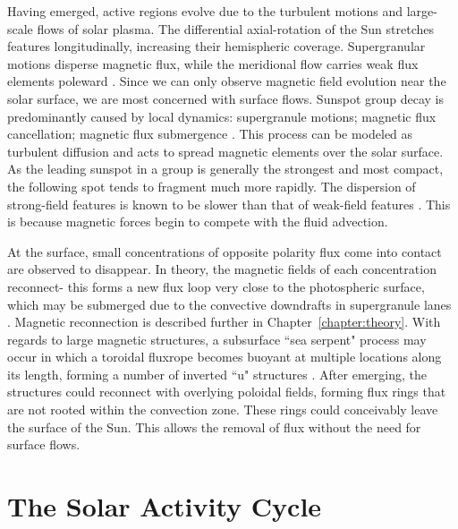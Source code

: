 Having emerged, active regions evolve due to the turbulent motions and large-scale flows of solar plasma. The differential axial-rotation of the Sun stretches features longitudinally, increasing their hemispheric coverage. Supergranular motions disperse magnetic flux, while the meridional flow carries weak flux elements poleward \citep{Mosher:1977}. Since we can only observe magnetic field evolution near the solar surface, we are most concerned with surface flows. Sunspot group decay is predominantly caused by local dynamics: supergranule motions; magnetic flux cancellation; magnetic flux submergence \citep{Schrijver:1997b}. This process can be modeled as turbulent diffusion \citep{Spruit:1987} and acts to spread magnetic elements over the solar surface. As the leading sunspot in a group is generally the strongest and most compact, the following spot tends to fragment much more rapidly. The dispersion of strong-field features is known to be slower than that of weak-field features \citep{Schrijver:1996}. This is because magnetic forces begin to compete with the fluid advection. 

At the surface, small concentrations of opposite polarity flux come into contact are observed to disappear. In theory, the magnetic fields of each concentration reconnect- this forms a new flux loop very close to the photospheric surface, which may be submerged due to the convective downdrafts in supergranule lanes \citep{Schrijver:1997b}. Magnetic reconnection is described further in Chapter~\ref{chapter:theory}. With regards to large magnetic structures, a subsurface ``sea serpent" process may occur in which a toroidal \gls{fluxrope} becomes buoyant at multiple locations along its length, forming a number of inverted ``u" structures \citep{Spruit:1987}. After emerging, the structures could reconnect with overlying poloidal fields, forming flux rings that are not rooted within the convection zone. These rings could conceivably leave the surface of the Sun. This allows the removal of flux without the need for surface flows. 

\section{The Solar Activity Cycle}\label{sect:introsolcyc}

